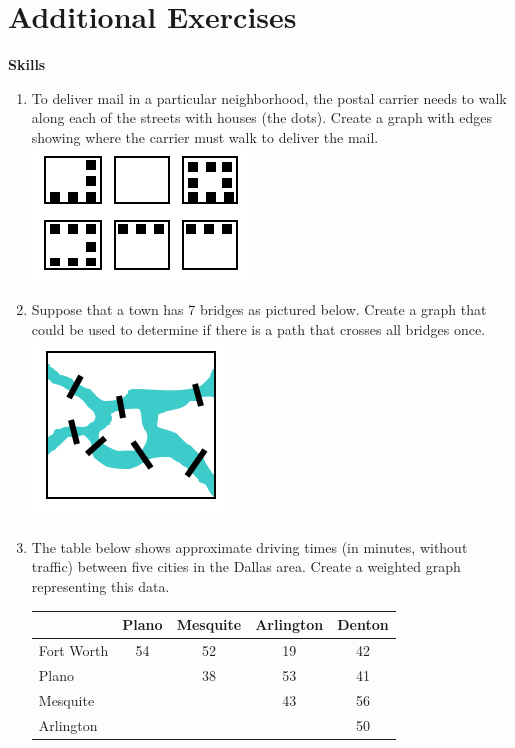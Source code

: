 \section{Additional Exercises}

\textbf{Skills}
\begin{enumerate}
\item	To deliver mail in a particular neighborhood, the postal carrier needs to walk along each of the streets with houses (the dots).  Create a graph with edges showing where the carrier must walk to deliver the mail.\\

\includegraphics{graph-theory-graphics/GraphExercise1.png}\\

\item	Suppose that a town has 7 bridges as pictured below.  Create a graph that could be used to determine if there is a path that crosses all bridges once.\\

\includegraphics{graph-theory-graphics/GraphExercise2.png}\\

\item	The table below shows approximate driving times (in minutes, without traffic) between five cities in the Dallas area.  Create a weighted graph representing this data.
\begin{center}
\begin{tabular}{|l|c|c|c|c|}
\hline
&Plano&Mesquite&Arlington&Denton\\
\hline
Fort Worth&54&52&19&42\\
\hline
Plano&&38&53&41\\
\hline
Mesquite&&&43&56\\
\hline
Arlington&&&&50\\
\hline
\end{tabular}
\end{center}


\end{enumerate}
